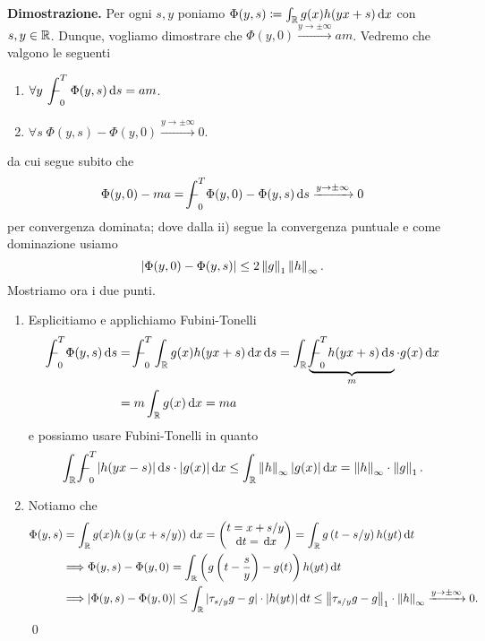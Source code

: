 \textbf{Dimostrazione.}
Per ogni $s, y$ poniamo $\Phi(y, s) \coloneqq \int_\mathbb R g(x) h(yx + s) \,\mathrm{d} x$ con $s, y \in \mathbb R$. Dunque, vogliamo dimostrare che $\Phi(y, 0) \xrightarrow{y \to \pm\infty} a m$.
Vedremo che valgono le seguenti
\begin{enumerate}
	\item $\forall y \; \ds \avint_0^T \Phi(y, s) \dd s = am$.
	\item $\forall s \; \Phi(y, s) - \Phi(y, 0) \xrightarrow{y \to \pm \infty} 0$.
\end{enumerate}
da cui segue subito che
$$
\Phi(y, 0) - ma = \avint_0^T \Phi(y, 0) - \Phi(y, s) \dd s \xrightarrow{y \to \pm \infty} 0
$$
per convergenza dominata; dove dalla ii) segue la convergenza puntuale e come dominazione usiamo
$$
	|\Phi(y, 0) - \Phi(y, s)| \leq 2 \left\lVert g \right\rVert_1 \left\lVert h \right\rVert_\infty.
$$
Mostriamo ora i due punti.
\begin{enumerate}
	\item Esplicitiamo e applichiamo Fubini-Tonelli
		$$
		\begin{aligned}
			\avint_0^T \Phi(y, s) \dd s
			&= \avint_0^T \int_\R g(x) h(yx + s) \dd x \dd s
			= \int_\R \underbrace{\avint_0^T h(yx + s) \dd s}_m \cdot g(x) \dd x \\
			&= m \int_\R g(x) \dd x = m a
		\end{aligned}
		$$
		e possiamo usare Fubini-Tonelli in quanto 
		$$
			\ds \int_\R \avint_0^T |h(yx - s)| \dd s \cdot |g(x)| \dd x \leq \int_\R \norm{h}_\infty |g(x)| \dd x = \norm{h}_\infty \cdot \norm{g}_1.
		$$

	\item Notiamo che
		\begin{align*}
			\Phi(y, s) 
			& = \int_\mathbb R g(x) h\left(y \left( x + s/y \right)\right) \,\mathrm{d} x
			= \begin{pmatrix}
				t = x + s/y \\
				\,\mathrm{d} t = \,\mathrm{d} x
			\end{pmatrix} 
			= \int_\mathbb R g \left( t - s/y \right) h(yt) \,\mathrm{d} t \\
			& \Longrightarrow \Phi(y, s) - \Phi(y, 0) = \int_\mathbb R \left(g\left( t - \frac{s}{y}\right) - g(t) \right) h(yt) \,\mathrm{d} t \\
			& \Longrightarrow 
			|\Phi(y, s) - \Phi(y, 0)| \leq \int_\mathbb R |\tau_{s/y} g - g| \cdot |h(yt)| \,\mathrm{d} t
			\leq \left\lVert \tau_{s/y} g - g \right\rVert_1 \cdot \left\lVert h \right\rVert_\infty \xrightarrow{y \to \pm \infty} 0.
		\end{align*}
\qed
\end{enumerate}

